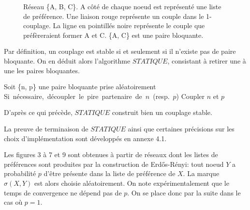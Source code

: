 \documentclass[12pt,a4paper]{article}
\begin{document}
\vspace{0.2cm}
  \begin{figure}[H]
    \centering
    \caption{Réseau \{A, B, C\}. A côté de chaque noeud est représenté une liste de préférence. Une liaison rouge représente un couple dans le 1-couplage. La ligne en pointillés noire représente le couple que préfèreraient former A et C. \{A, C\} est une paire bloquante.}
  \end{figure}
\vspace{0.2cm} 

Par définition, un couplage est stable si et seulement si il n'existe pas de paire bloquante. 
On en déduit alors l'algorithme $STATIQUE$, consistant à retirer une à une les paires bloquantes.

\begin{algorithm}
  \caption{Calcul b-couplage stable statique}
  \begin{algorithmic}
        \State Soit \{n, p\} une paire bloquante prise aléatoirement
        \State Si\ n\'ecessaire,\ d\'ecoupler\ le\ pire\ partenaire\ de\ $n$\ (resp.\ $p$)
        \State Coupler $n$ et $p$
    \EndWhile
    \EndProcedure
    \end{algorithmic}

\end{algorithm}

D'après ce qui précède, $STATIQUE$ construit bien un couplage stable.

La preuve de terminaison de $STATIQUE$ ainsi que certaines précisions sur les choix d'implémentation sont développés en annexe 4.1.

Les figures 3 à 7 et 9 sont obtenues à partir de réseaux dont les listes de préférences sont produites par la construction de Erd\H{o}s-Rényi: tout noeud $Y$ a probabilité $p$ d'être présente dans la liste de préférence de $X$. 
La marque $\sigma(X, Y)$ est alors choisie aléatoirement. 
On note expérimentalement que le temps de convergence ne dépend pas de $p$. 
On se place donc par la suite dans le cas où $p=1$. 
\end{document}
